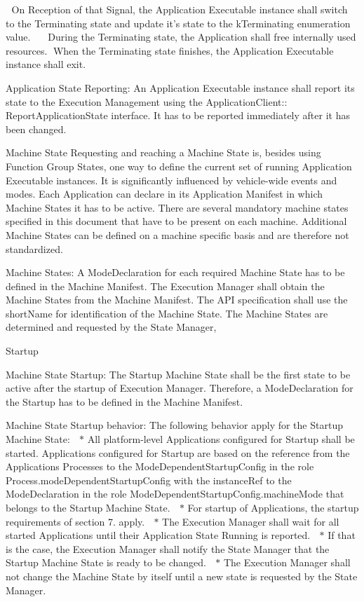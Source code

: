 \begin{DoxyItemize}
\begin{DoxyItemize}
\begin{DoxyItemize}
 On Reception of that Signal, the Application Executable instance shall switch to the Terminating state and update it’s state to the k\+Terminating enumeration value.  ~\newline
 During the Terminating state, the Application shall free internally used resources. \+When the Terminating state finishes, the Application Executable instance shall exit.
\item Application State Reporting\+: An Application Executable instance shall report its state to the Execution Management using the Application\+Client\+:\+: Report\+Application\+State interface. It has to be reported immediately after it has been changed.
\end{DoxyItemize}
\item Machine State Requesting and reaching a Machine State is, besides using Function Group States, one way to define the current set of running Application Executable instances. It is significantly influenced by vehicle-\/wide events and modes. Each Application can declare in its Application Manifest in which Machine States it has to be active. There are several mandatory machine states specified in this document that have to be present on each machine. Additional Machine States can be defined on a machine specific basis and are therefore not standardized.
\begin{DoxyItemize}
\item Machine States\+: A Mode\+Declaration for each required Machine State has to be defined in the Machine Manifest. The Execution Manager shall obtain the Machine States from the Machine Manifest. The A\+PI specification shall use the short\+Name for identification of the Machine State. The Machine States are determined and requested by the State Manager,
\item Startup
\begin{DoxyItemize}
\item Machine State Startup\+: The Startup Machine State shall be the first state to be active after the startup of Execution Manager. Therefore, a Mode\+Declaration for the Startup has to be defined in the Machine Manifest.
\item Machine State Startup behavior\+: The following behavior apply for the Startup Machine State\+:  $\ast$ All platform-\/level Applications configured for Startup shall be started. Applications configured for Startup are based on the reference from the Applications Processes to the Mode\+Dependent\+Startup\+Config in the role Process.\+mode\+Dependent\+Startup\+Config with the instance\+Ref to the Mode\+Declaration in the role Mode\+Dependent\+Startup\+Config.\+machine\+Mode that belongs to the Startup Machine State.  $\ast$ For startup of Applications, the startup requirements of section 7. apply.  $\ast$ The Execution Manager shall wait for all started Applications until their Application State Running is reported.  $\ast$ If that is the case, the Execution Manager shall notify the State Manager that the Startup Machine State is ready to be changed.  $\ast$ The Execution Manager shall not change the Machine State by itself until a new state is requested by the State Manager.

\end{DoxyItemize}
\end{DoxyItemize}
\end{DoxyItemize}
\end{DoxyItemize}
